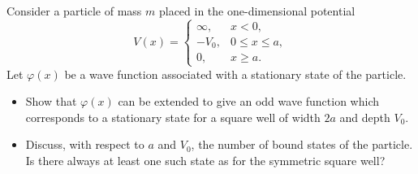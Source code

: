 \documentclass[12pt,a4paper]{article}
\newenvironment{problem}[2][Problem]{\begin{trivlist}
\item[\hskip \labelsep {\bfseries #1}\hskip \labelsep {\bfseries #2.}]}{\end{trivlist}}
\begin{document}
\begin{problem}{1}
[C-T Exercise 1-7] Consider a particle of mass $m$ placed in the one-dimensional potential
\begin{equation}
V(x)=
\left\{\begin{array}{ll}
\infty,&x<0,\\
-V_0,&0\leq x\leq a,\\
0,&x\geq a.
\end{array}\right.
\end{equation}
Let $\varphi(x)$ be a wave function associated with a stationary state of the particle.
\begin{itemize}
\item[(a)] Show that $\varphi(x)$  can be extended to give an odd wave function which corresponds to a stationary state for a square well of width $2a$ and depth $V_0$.
\item[(b)]  Discuss, with respect to $a$ and $V_0$, the number of bound states of the particle. Is there always at least one such state as for the symmetric square well?
\end{itemize}
\end{problem}
\end{document}
